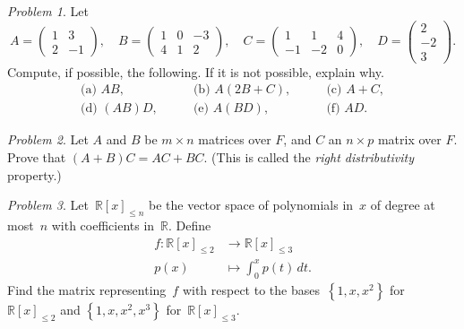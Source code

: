 \documentclass[11pt,twoside]{amsart}
\theoremstyle{plain}
\theoremstyle{remark}
\newtheorem{prob}{Problem}
\theoremstyle{definition}
\theoremstyle{definition}
\newcommand{\R}{\mathbb{R}}
\begin{document}
\begin{prob}
Let 
  \[A=\begin{pmatrix} 1 & 3\\ 2& -1\end{pmatrix}, \quad B=\begin{pmatrix} 1 & 0 & -3\\ 4 & 1 & 2\end{pmatrix}, \quad C=\begin{pmatrix} 1 & 1 & 4\\ -1 & -2 & 0\end{pmatrix}, \quad D=\begin{pmatrix} 2 \\ -2 \\ 3\end{pmatrix}.\]
  Compute, if possible, the following. If it is not possible, explain why.
  \[
  \begin{array}{lll}
\text{(a) }AB,\qquad &\text{(b) } A(2B+C),\qquad &\text{(c) } A+C,\\
\text{(d) }(AB)D,\qquad &\text{(e) }A(BD),\qquad &\text{(f) }AD.
  \end{array}\]
\end{prob}

\begin{prob}
Let $A$ and $B$ be $m\times n$ matrices over $F$, and $C$ an $n\times p$
    matrix over $F$. Prove that $(A+B)C=AC+BC$. (This is called the {\em right
    distributivity} property.)
\end{prob}

\begin{prob}
Let~$\R[x]_{\leq n}$ be the vector space of polynomials in~$x$ of degree at
    most~$n$ with coefficients in~$\R$. Define
    \begin{align*}
      f\colon\R[x]_{\leq 2}&\to\R[x]_{\leq 3}\\[8pt]
      p(x)&\mapsto \int_{0}^x p(t)\,dt.
    \end{align*}
    Find the matrix representing~$f$ with respect to the bases~$\left\{ 1,x,x^2
    \right\}$ for~$\R[x]_{\leq 2}$ and $\left\{ 1,x,x^2,x^3 \right\}$
    for~$\R[x]_{\leq 3}$.
\end{prob}
\end{document}
